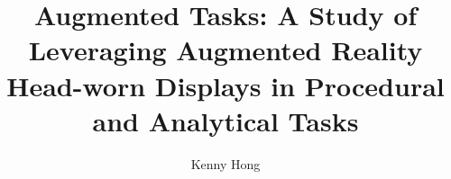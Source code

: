 \title{Augmented Tasks: A Study of Leveraging Augmented Reality Head-worn Displays in Procedural and Analytical Tasks}%
\author{Kenny Hong}
%
%
%
\maketitle
\cleardoublepage
\thispagestyle{empty}
\startarabicpagination
